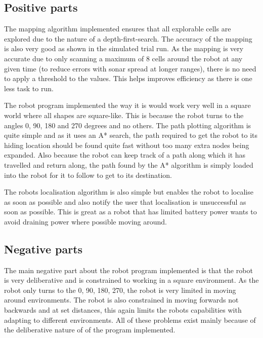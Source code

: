 \documentclass[a4paper,12pt]{article}
\begin{document}
\subsection{Positive parts}
\noindent The mapping algorithm implemented ensures that all explorable cells are explored due to the nature of a depth-first-search. The accuracy of the mapping is also very good as shown in the simulated trial run. As the mapping is very accurate due to only scanning a maximum of 8 cells around the robot at any given time (to reduce errors with sonar spread at longer ranges), there is no need to apply a threshold to the values. This helps improves efficiency as there is one less task to run.

\vspace{5mm}
\noindent The robot program implemented the way it is would work very well in a square world where all shapes are square-like. This is because the robot turns to the angles 0, 90, 180 and 270 degrees and no others. The path plotting algorithm is quite simple and as it uses an A* search, the path required to get the robot to its hiding location should be found quite fast without too many extra nodes being expanded. Also because the robot can keep track of a path along which it has travelled and return along, the path found by the A* algorithm is simply loaded into the robot for it to follow to get to its destination.

\vspace{5mm}
\noindent The robots localisation algorithm is also simple but enables the robot to localise as soon as possible and also notify the user that localisation is unsuccessful as soon as possible. This is great as a robot that has limited battery power wants to avoid draining power where possible moving around.

\subsection{Negative parts}
\noindent The main negative part about the robot program implemented is that the robot is very deliberative and is constrained to working in a square environment. As the robot only turns to the 0, 90, 180, 270, the robot is very limited in moving around environments. The robot is also constrained in moving forwards not backwards and at set distances, this again limits the robots capabilities with adapting to different environments. All of these problems exist mainly because of the deliberative nature of of the program implemented.
\end{document}
